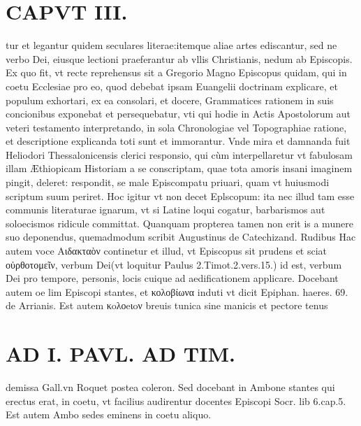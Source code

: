 \documentclass{article}
\begin{document}
\begin{pages}
\section*{CAPVT  III. }
\marginpar{[ p.129 ]}\pstart tur et legantur quidem seculares literae:itemque  aliae artes ediscantur, sed ne verbo Dei, eiusque lectioni praeferantur ab vllis Christianis, nedum ab Episcopis. Ex quo fit, vt recte reprehensus sit a Gregorio Magno Episcopus quidam, qui in coetu Ecclesiae pro eo, quod debebat ipsam Euangelii doctrinam explicare, et populum exhortari, ex ea consolari, et docere, Grammatices rationem in suis concionibus exponebat et persequebatur, vti qui hodie in Actis Apostolorum aut veteri testamento interpretando, in sola Chronologiae vel Topographiae ratione, et descriptione explicanda toti sunt et immorantur. Vnde mira et damnanda fuit Heliodori Thessalonicensis clerici responsio, qui cùm interpellaretur vt fabulosam illam Æthiopicam Historiam a se conscriptam, quae tota amoris insani imaginem pingit, deleret: respondit, se male Episcompatu priuari, quam vt huiusmodi scriptum suum periret. Hoc igitur vt non decet Eplscopum: ita nec illud tam esse communis literaturae ignarum, vt si Latine loqui cogatur, barbarismos aut soloecismos ridicule committat. Quanquam propterea tamen non erit is a munere suo deponendus, quemadmodum scribit Augustinus de Catechizand. Rudibus   \pend\pstart Hac autem voce Αιδακταὸν continetur et illud, vt Episcopus sit prudens et sciat οὐρθοτομεῖν, verbum Dei(vt loquitur Paulus 2.Timot.2.vers.15.) id est, verbum Dei pro tempore, personis, locis cuique ad aedificationem applicare. Docebant autem oe lim Episcopi stantes, et κολοβίωνα induti vt dicit Epiphan. haeres. 69. de Arrianis. Est autem κoλοeιoν breuis tunica sine manicis et pectore tenus  \pend
\section*{AD I. PAVL. AD TIM. }
\marginpar{[ p.130 ]}\pstart demissa Gall.vn Roquet postea coleron. Sed docebant in Ambone stantes qui erectus erat, in coetu, vt facilius audirentur docentes Episcopi Socr. lib 6.cap.5. Est autem Ambo sedes eminens in coetu aliquo.  \pend
{}
{}

\end{pages}
\end{document}
